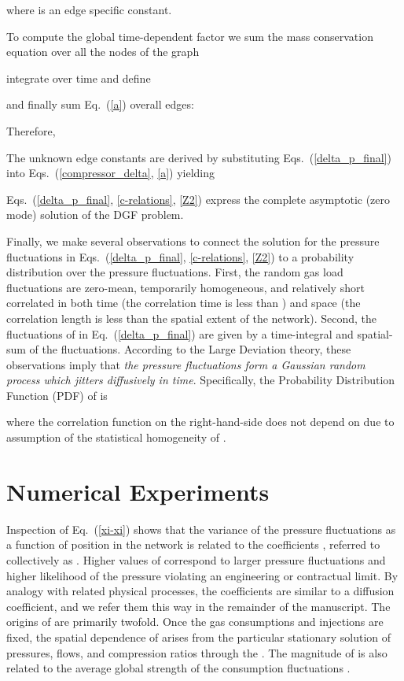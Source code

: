 \documentclass[10pt, conference, compsocconf]{IEEEtran}
\begin{document}
where  is an edge specific constant.

To compute the global time-dependent factor  we sum the mass conservation equation over all the nodes of the graph

integrate over time and define

and finally sum Eq.~(\ref{a}) overall edges:

Therefore, 

The unknown edge constants  are derived by substituting Eqs.~(\ref{delta_p_final}) into Eqs.~(\ref{compressor_delta}, \ref{a}) yielding

Eqs.~(\ref{delta_p_final}, \ref{c-relations}, \ref{Z2}) express the complete asymptotic (zero mode) solution of the DGF problem.

Finally, we make several observations to connect the solution for the pressure fluctuations in Eqs.~(\ref{delta_p_final}, \ref{c-relations}, \ref{Z2}) to a probability distribution over the pressure fluctuations.  First, the random gas load fluctuations  are zero-mean, temporarily homogeneous, and  relatively short correlated in both time (the correlation time is less than ) and space (the correlation length is less than the spatial extent of the network). Second, the fluctuations of  in Eq.~(\ref{delta_p_final}) are given by a time-integral and spatial-sum of the fluctuations.  According to the Large Deviation theory, these observations imply that {\em the pressure fluctuations form a Gaussian random process which jitters diffusively in time}. Specifically, the Probability Distribution Function (PDF) of  is

where the correlation function on the right-hand-side does not depend on   due to assumption of the statistical homogeneity of .

\section{Numerical Experiments}
\label{sec:exp}


Inspection of Eq.~(\ref{xi-xi}) shows that the variance of the pressure fluctuations as a function of position in the network is related to the coefficients , referred to collectively as . Higher values of  correspond to larger pressure fluctuations and higher likelihood of the pressure violating an engineering or contractual limit.  By analogy with related physical processes, the coefficients  are similar to a diffusion coefficient, and we refer them this way in the remainder of the manuscript.  The origins of  are primarily twofold.  Once the gas consumptions and injections are fixed, the spatial dependence of  arises from the particular stationary solution of pressures, flows, and compression ratios through the . The magnitude of  is also related to the average global strength of the consumption fluctuations .
\end{document}
